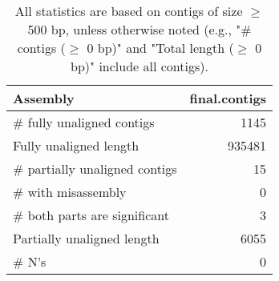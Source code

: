 \documentclass[12pt,a4paper]{article}
\begin{document}
\begin{table}[ht]
\begin{center}
\caption{All statistics are based on contigs of size $\geq$ 500 bp, unless otherwise noted (e.g., "\# contigs ($\geq$ 0 bp)" and "Total length ($\geq$ 0 bp)" include all contigs).}
\begin{tabular}{|l*{1}{|r}|}
\hline
Assembly & final.contigs \\ \hline
\# fully unaligned contigs & 1145 \\ \hline
Fully unaligned length & 935481 \\ \hline
\# partially unaligned contigs & 15 \\ \hline
\hspace{5mm}\# with misassembly & 0 \\ \hline
\hspace{5mm}\# both parts are significant & 3 \\ \hline
Partially unaligned length & 6055 \\ \hline
\# N's & 0 \\ \hline
\end{tabular}
\end{center}
\end{table}
\end{document}

